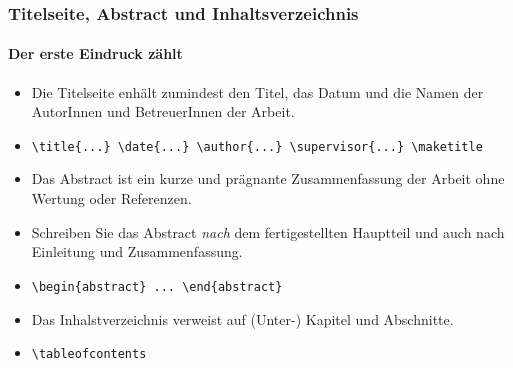 \begin{frame}
	\frametitle{Titelseite, Abstract und Inhaltsverzeichnis}
	\framesubtitle{Der erste Eindruck zählt}

	\begin{mybox}{}
		\begin{itemize}
			\item Die Titelseite enhält zumindest den Titel, 
			das Datum und die Namen der AutorInnen und BetreuerInnen der Arbeit.
			\item<3-> \texttt{\textbackslash title\{...\} 
				\textbackslash date\{...\} 
				\textbackslash author\{...\}
				\textbackslash supervisor\{...\}
				\textbackslash maketitle}
		\end{itemize}
	\end{mybox}
\bigskip
{}
\begin{mybox}{}
	\begin{itemize}
		\item Das Abstract ist ein kurze und prägnante Zusammenfassung der Arbeit ohne Wertung oder Referenzen.
		\item<5-> Schreiben Sie das Abstract \emph{nach} dem fertigestellten Hauptteil und auch
		nach Einleitung und Zusammenfassung.
		\item<6-> \texttt{\textbackslash begin\{abstract\} ... \textbackslash end\{abstract\}}
	\end{itemize}
\end{mybox}
\bigskip
{}
\begin{mybox}{}
	\begin{itemize}
		\item Das Inhalstverzeichnis verweist auf (Unter-) Kapitel und Abschnitte.
		\item<8> \texttt{\textbackslash tableofcontents}
	\end{itemize}
\end{mybox}
\end{frame}

